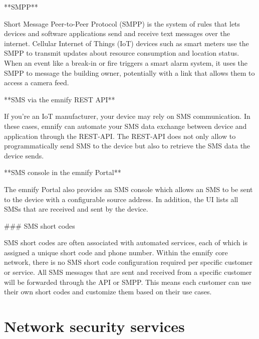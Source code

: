 \documentclass[11pt, oneside]{article}   	%
\begin{document}
\begin{markdown}

**SMPP**

Short Message Peer-to-Peer Protocol (SMPP) is the system of rules that lets devices and software applications send and receive text messages over the internet.
Cellular Internet of Things (IoT) devices such as smart meters use the SMPP to transmit updates about resource consumption and location status.
When an event like a break-in or fire triggers a smart alarm system, it uses the SMPP to message the building owner, potentially with a link that allows them to access a camera feed.

**SMS via the emnify REST API**

If you're an IoT manufacturer, your device may rely on SMS communication.
In these cases, emnify can automate your SMS data exchange between device and application through the REST-API.
The REST-API does not only allow to programmatically send SMS to the device but also to retrieve the SMS data the device sends.

**SMS console in the emnify Portal**

The emnify Portal also provides an SMS console which allows an SMS to be sent to the device with a configurable source address.
In addition, the UI lists all SMSs that are received and sent by the device.

### SMS short codes

SMS short codes are often associated with automated services, each of which is assigned a unique short code and phone number.
Within the emnify core network, there is no SMS short code configuration required per specific customer or service.
All SMS messages that are sent and received from a specific customer will be forwarded through the API or SMPP.
This means each customer can use their own short codes and customize them based on their use cases.

\end{markdown}

\section{Network security services}
\end{document}
